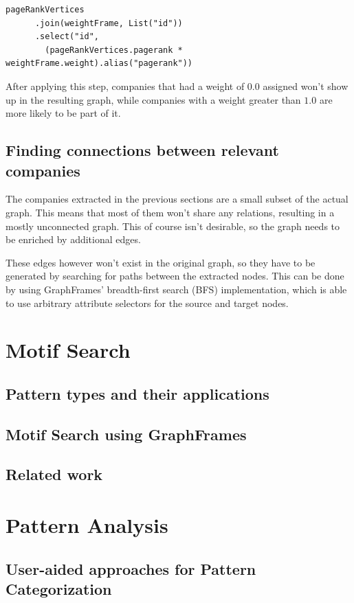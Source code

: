 \documentclass[
        a4paper,     %
        titlepage,   %
        oneside,     %
        parskip      %
        ]{scrartcl}  %
\begin{document}
  \begin{lstlisting}[style=scalaStyle,caption=Custom Weight Joining]
    pageRankVertices
      .join(weightFrame, List("id"))
      .select("id",
        (pageRankVertices.pagerank * weightFrame.weight).alias("pagerank"))
  \end{lstlisting}

  After applying this step, companies that had a weight of $0.0$ assigned won't
  show up in the resulting graph, while companies with a weight greater than $1.0$
  are more likely to be part of it.

  \subsection{Finding connections between relevant companies}
  The companies extracted in the previous sections are a small subset of the actual
  graph. This means that most of them won't share any relations, resulting in a
  mostly unconnected graph. This of course isn't desirable, so the graph needs to
  be enriched by additional edges.

  These edges however won't exist in the original graph, so they have to be generated
  by searching for paths between the extracted nodes. This can be done by using
  GraphFrames' breadth-first search (BFS) implementation, which is able to use arbitrary
  attribute selectors for the source and target nodes.

  \pagebreak

  \section{Motif Search}
    \subsection{Pattern types and their applications}
    \subsection{Motif Search using GraphFrames}
    \subsection{Related work}
    \pagebreak

  \section{Pattern Analysis}
    \subsection{User-aided approaches for Pattern Categorization}
\end{document}
